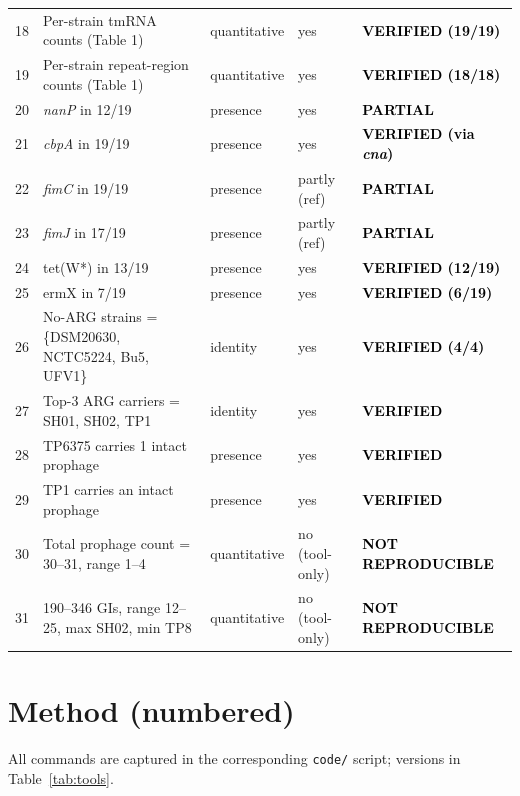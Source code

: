 \documentclass[11pt,a4paper]{article}
\newcommand{\verdict}[1]{\textbf{\textcolor{black}{#1}}}
\begin{document}
\begin{longtable}{@{}p{0.5cm}p{7.3cm}p{2.5cm}p{2.3cm}p{2.5cm}@{}}
18 & Per-strain tmRNA counts (Table 1) & quantitative & yes & \verdict{VERIFIED (19/19)} \\
19 & Per-strain repeat-region counts (Table 1) & quantitative & yes & \verdict{VERIFIED (18/18)} \\
20 & \emph{nanP} in 12/19 & presence & yes & \verdict{PARTIAL} \\
21 & \emph{cbpA} in 19/19 & presence & yes & \verdict{VERIFIED (via \emph{cna})} \\
22 & \emph{fimC} in 19/19 & presence & partly (ref) & \verdict{PARTIAL} \\
23 & \emph{fimJ} in 17/19 & presence & partly (ref) & \verdict{PARTIAL} \\
24 & tet(W*) in 13/19 & presence & yes & \verdict{VERIFIED (12/19)} \\
25 & ermX in 7/19 & presence & yes & \verdict{VERIFIED (6/19)} \\
26 & No-ARG strains = \{DSM20630, NCTC5224, Bu5, UFV1\} & identity & yes & \verdict{VERIFIED (4/4)} \\
27 & Top-3 ARG carriers = SH01, SH02, TP1 & identity & yes & \verdict{VERIFIED} \\
28 & TP6375 carries 1 intact prophage & presence & yes & \verdict{VERIFIED} \\
29 & TP1 carries an intact prophage & presence & yes & \verdict{VERIFIED} \\
30 & Total prophage count = 30--31, range 1--4 & quantitative & no (tool-only) & \verdict{NOT REPRODUCIBLE} \\
31 & 190--346 GIs, range 12--25, max SH02, min TP8 & quantitative & no (tool-only) & \verdict{NOT REPRODUCIBLE} \\
\bottomrule
\end{longtable}

\section{Method (numbered)}
All commands are captured in the corresponding \texttt{code/} script; versions in Table~\ref{tab:tools}.
\end{document}
